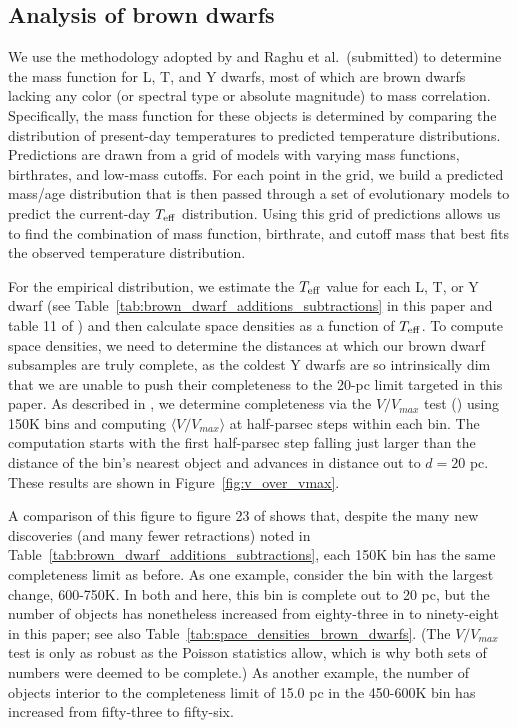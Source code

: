 \documentclass[twocolumn,tighten,twocolappendix]{aastex631}
\begin{document}
\subsection{Analysis of brown dwarfs\label{sec:analysis_brown_dwarfs}}

We use the methodology adopted by \cite{kirkpatrick2019,kirkpatrick2021} and Raghu et al.\ (submitted) to determine the mass function for L, T, and Y dwarfs, most of which are brown dwarfs lacking any color (or spectral type or absolute magnitude) to mass correlation. Specifically, the mass function for these objects is determined by comparing the distribution of present-day temperatures to predicted temperature distributions. Predictions are drawn from a grid of models with varying mass functions, birthrates, and low-mass cutoffs. For each point in the grid, we build a predicted mass/age distribution that is then passed through a set of evolutionary models to predict the current-day $T_{\rm eff}$ distribution. Using this grid of predictions allows us to find the combination of mass function, birthrate, and cutoff mass that best fits the observed temperature distribution.

For the empirical distribution, we estimate the $T_{\rm eff}$ value for each L, T, or Y dwarf (see Table~\ref{tab:brown_dwarf_additions_subtractions} in this paper and table 11 of \citealt{kirkpatrick2021}) and then calculate space densities as a function of $T_{\rm eff}$. To compute space densities, we need to determine the distances at which our brown dwarf subsamples are truly complete, as the coldest Y dwarfs are so intrinsically dim that we are unable to push their completeness to the 20-pc limit targeted in this paper. As described in \cite{kirkpatrick2021}, we determine completeness via the $V/V_{max}$ test (\citealt{schmidt1968}) using 150K bins and computing $\langle{V}/{V_{max}}\rangle$ at half-parsec steps within each bin. The computation starts with the first half-parsec step falling just larger than the distance of the bin's nearest object and advances in distance out to $d = 20$ pc. These results are shown in Figure~\ref{fig:v_over_vmax}.

A comparison of this figure to figure 23 of \cite{kirkpatrick2021} shows that, despite the many new discoveries (and many fewer retractions) noted in Table~\ref{tab:brown_dwarf_additions_subtractions}, each 150K bin has the same completeness limit as before. As one example, consider the bin with the largest change, 600-750K. In both \cite{kirkpatrick2021} and here, this bin is complete out to 20 pc, but the number of objects has nonetheless increased from eighty-three in \cite{kirkpatrick2021} to ninety-eight in this paper; see also Table~\ref{tab:space_densities_brown_dwarfs}. (The $V/V_{max}$ test is only as robust as the Poisson statistics allow, which is why both sets of numbers were deemed to be complete.) As another example, the number of objects interior to the completeness limit of 15.0 pc in the 450-600K bin has increased from fifty-three to fifty-six. 
\end{document}
